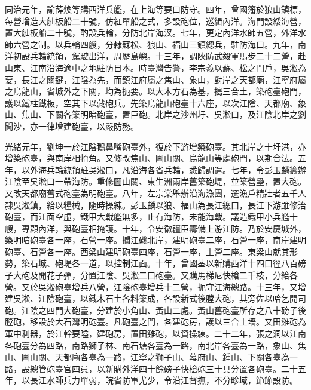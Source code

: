 \begin{pinyinscope}
同治元年，諭薛煥等購西洋兵艦，在上海等要口防守。四年，曾國籓於狼山鎮標，每營增造大舢板船二十號，仿紅單船之式，多設砲位，巡緝內洋。海門設綏海營，置大舢板船二十號，酌設兵輪，分防北岸海汊。七年，更定內洋水師五營，外洋水師六營之制。以兵輪四艘，分隸蘇松、狼山、福山三鎮總兵，駐防海口。九年，南洋初設兵輪統領，駕駛出洋，周歷島嶼。十三年，調陜防武毅軍馬步二十二營，赴山東、江南沿海適中之地駐防日本。時臺灣告警，李宗羲以蘇、松之門戶，吳淞為要，長江之關鍵，江陰為先，而鎮江府屬之焦山、象山，對岸之天都廟，江寧府屬之烏龍山，省城外之下關，均為扼要。以大木方石為基，搗三合土，築砲臺砲門，護以鐵柱鐵板，空其下以藏砲兵。先築烏龍山砲臺十六座，以次江陰、天都廟、象山、焦山、下關各築明暗砲臺，置巨砲。北岸之沙州圩、吳淞口，及江陰北岸之劉聞沙，亦一律增建砲臺，以嚴防務。

光緒元年，劉坤一於江陰鵝鼻嘴砲臺外，復於下游增築砲臺。其北岸之十圩港，亦增築砲臺，與南岸相犄角。又修改焦山、圌山關、烏龍山等處砲門，以期合法。五年，以外海兵輪統領駐吳淞口，凡沿海各省兵輪，悉歸調遣。七年，令彭玉麟籌辦江陰至吳淞口一帶海防。重修圌山關、東生洲兩岸舊築砲堤，並築營壘，置大砲。又改天都廟舊式砲臺為明砲臺。八年，左宗棠舉辦沿海漁團，選漁戶精壯者五千人隸吳淞鎮，給以糧械，隨時操練。彭玉麟以狼、福山為長江總口，長江下游雖修治砲臺，而江面空虛，鐵甲大戰艦無多，止有海防，未能海戰。議造鐵甲小兵艦十艘，專顧內洋，與砲臺相掩護。十年，令安徽疆臣籌備上游江防。乃於安慶城外，築明暗砲臺各一座，石營一座。攔江磯北岸，建明砲臺二座，石營一座，南岸建明砲臺、石營各一座。西梁山建明砲臺四座，石營一座，土營二座。東梁山就其形勢，築石城、砲堤各一道，以控制江面。十年，曾國荃以新購西洋十四口徑八百磅子大砲及開花子彈，分置江陰、吳淞二口砲臺。又購馬梯尼快槍二千枝，分給各營。又於吳淞砲臺增兵八營，江陰砲臺增兵十二營，扼守江海總路。十三年，又增建吳淞、江陰砲臺，以鐵木石土各料築成，各設新式後膛大砲，其旁佐以哈乞開司砲。江陰之四門大砲臺，分建於小角山、黃山二處。黃山舊砲臺所存之八十磅子後膛砲，移設於大石灣明砲臺。凡砲臺之門，各建砲房，護以三合土墻。又田雞砲為軍中利器，於江幹要隘，建砲房，置田雞砲，以資操練。二十二年，張之洞以江南各砲臺分為四路，南路獅子林、南石塘各臺為一路，南北岸各臺為一路，象山、焦山、圌山關、天都廟各臺為一路，江寧之獅子山、幕府山、鍾山、下關各臺為一路，設總管砲臺官四員，以新購外洋四十餘磅子快槍砲三十具分置各砲臺。二十五年，以長江水師兵力單弱，皖省防軍尤少，令沿江督撫，不分畛域，節節設防。


\end{pinyinscope}
